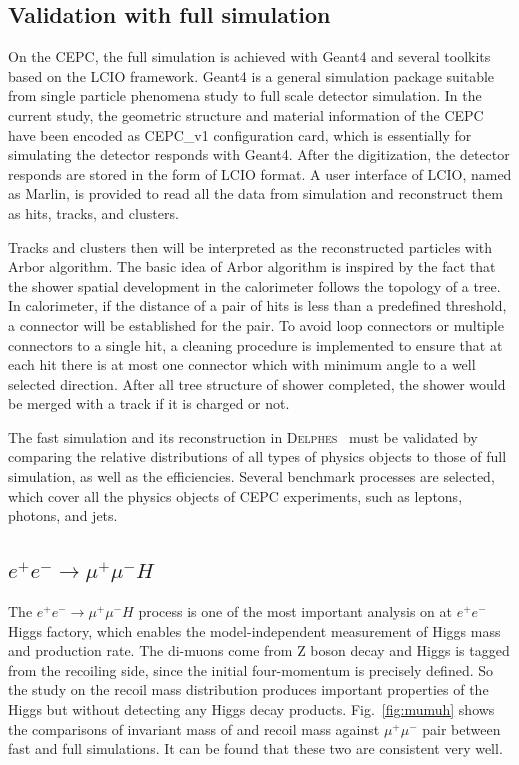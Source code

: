\documentclass[a4paper,10pt,twoside]{cpc-hepnp}
\begin{document}
\begin{multicols}{2}
\section{Validation with full simulation\label{sec:validation}}


On the CEPC, the full simulation is achieved with Geant4 and several toolkits based on the LCIO framework\cite{ref:lcio}.
Geant4\cite{ref:geant4} is a general simulation package suitable from single particle phenomena study to full scale detector simulation.
In the current study, the geometric structure and material information of the CEPC have been encoded as CEPC\_v1 configuration card,
which is essentially for simulating the detector responds with Geant4.
After the digitization, the detector responds are stored in the form of LCIO format.
A user interface of LCIO, named as Marlin, is provided to read all the data from simulation and reconstruct them as hits, tracks, and clusters.

Tracks and clusters then will be interpreted as the reconstructed particles with Arbor algorithm\cite{ref:arbor}.
The basic idea of Arbor algorithm is inspired by the fact that the shower spatial development  in the calorimeter follows the topology of a tree.
In calorimeter, if the distance of a pair of hits is less than a predefined threshold, a connector will be established for the pair.
To avoid loop connectors or multiple connectors to a single hit,
a cleaning procedure is implemented to ensure that at each hit there is at most one connector which with minimum angle
to a well selected direction.
After all tree structure of shower completed, the shower would be merged with a track if it is charged or not.


The fast simulation and its reconstruction in {\textsc{Delphes}~} must be validated by comparing the relative distributions
of all types of physics objects to those of full simulation, as well as the efficiencies.
Several benchmark processes are selected, which cover all the physics objects of CEPC experiments, such as leptons, photons, and jets.


\subsection{$e^+e^-\to \mu^+\mu^-H$}

The $e^+e^- \to \mu^+\mu^-H$ process is one of the most important analysis on at $e^+e^-$ Higgs factory,
which enables the model-independent measurement of Higgs mass and production rate.
The di-muons come from Z boson decay and Higgs is tagged from the recoiling side, since the initial four-momentum is precisely defined.
So the study on the recoil mass distribution produces important properties of the Higgs but without detecting any Higgs decay products.
Fig.~\ref{fig:mumuh} shows the comparisons of invariant mass of and recoil mass against $\mu^+\mu^-$ pair between fast and full simulations.
It can be found that these two are consistent very well.


\end{multicols}
\end{document}
